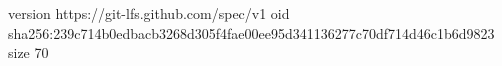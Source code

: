 version https://git-lfs.github.com/spec/v1
oid sha256:239c714b0edbacb3268d305f4fae00ee95d341136277c70df714d46c1b6d9823
size 70
